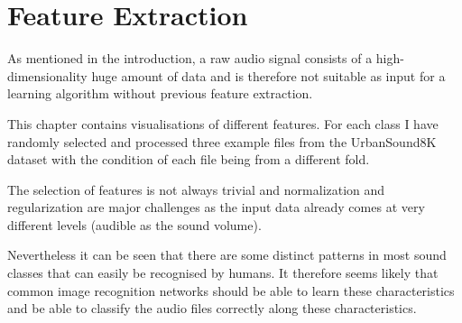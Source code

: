




\section{Feature Extraction}
\label{extraction}

As mentioned in the introduction, a raw audio signal consists of a high-dimensionality huge amount of data and is therefore not suitable as input for a learning algorithm without previous feature extraction.

This chapter contains visualisations of different features. For each class I have randomly selected and processed three example files from the UrbanSound8K dataset with the condition of each file being from a different fold. 

The selection of features is not always trivial and normalization and regularization are major challenges as the input data already comes at very different levels (audible as the sound volume).

Nevertheless it can be seen that there are some distinct patterns in most sound classes that can easily be recognised by humans. It therefore seems likely that common image recognition networks should be able to learn these characteristics and be able to classify the audio files correctly along these characteristics.





